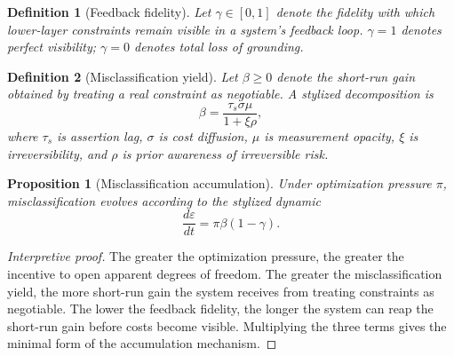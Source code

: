 \documentclass[11pt]{article}
\newtheorem{definition}{Definition}[section]
\newtheorem{proposition}{Proposition}[section]
\newcommand{\eps}{\varepsilon}
\begin{document}
\begin{definition}[Feedback fidelity]
Let \(\gamma\in[0,1]\) denote the fidelity with which lower-layer constraints remain visible in a system's feedback loop. \(\gamma=1\) denotes perfect visibility; \(\gamma=0\) denotes total loss of grounding.
\end{definition}

\begin{definition}[Misclassification yield]
Let \(\beta\ge 0\) denote the short-run gain obtained by treating a real constraint as negotiable. A stylized decomposition is
\[
\beta = \frac{\tau_s\sigma\mu}{1+\xi\rho},
\]
where \(\tau_s\) is assertion lag, \(\sigma\) is cost diffusion, \(\mu\) is measurement opacity, \(\xi\) is irreversibility, and \(\rho\) is prior awareness of irreversible risk.
\end{definition}

\begin{proposition}[Misclassification accumulation]
Under optimization pressure \(\pi\), misclassification evolves according to the stylized dynamic
\[
\frac{d\eps}{dt}=\pi\beta(1-\gamma).
\]
\end{proposition}

\begin{proof}[Interpretive proof]
The greater the optimization pressure, the greater the incentive to open apparent degrees of freedom. The greater the misclassification yield, the more short-run gain the system receives from treating constraints as negotiable. The lower the feedback fidelity, the longer the system can reap the short-run gain before costs become visible. Multiplying the three terms gives the minimal form of the accumulation mechanism.
\end{proof}
\end{document}

